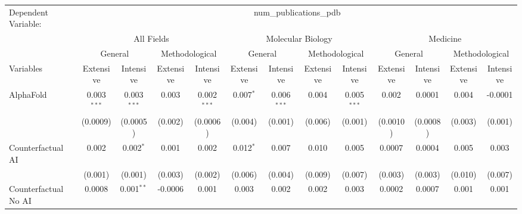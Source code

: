 \begingroup
\centering
\begin{tabular}{lcccccccccccc}
   \tabularnewline \midrule \midrule
   Dependent Variable: & \multicolumn{12}{c}{num\_publications\_pdb}\\
 & \multicolumn{4}{c}{All Fields} & \multicolumn{4}{c}{Molecular Biology} & \multicolumn{4}{c}{Medicine} \\
\cmidrule(lr){2-5} \cmidrule(lr){6-9} \cmidrule(lr){10-13}
 & \multicolumn{2}{c}{General} & \multicolumn{2}{c}{Methodological} & \multicolumn{2}{c}{General} & \multicolumn{2}{c}{Methodological} & \multicolumn{2}{c}{General} & \multicolumn{2}{c}{Methodological} \\
\cmidrule(lr){2-3} \cmidrule(lr){4-5} \cmidrule(lr){6-7} \cmidrule(lr){8-9} \cmidrule(lr){10-11} \cmidrule(lr){12-13}
Variables & \multicolumn{1}{c}{Extensive} & \multicolumn{1}{c}{Intensive} & \multicolumn{1}{c}{Extensive} & \multicolumn{1}{c}{Intensive} & \multicolumn{1}{c}{Extensive} & \multicolumn{1}{c}{Intensive} & \multicolumn{1}{c}{Extensive} & \multicolumn{1}{c}{Intensive} & \multicolumn{1}{c}{Extensive} & \multicolumn{1}{c}{Intensive} & \multicolumn{1}{c}{Extensive} & \multicolumn{1}{c}{Intensive} \\
\cmidrule(lr){1-1}\cmidrule(lr){2-2} \cmidrule(lr){3-3} \cmidrule(lr){4-4} \cmidrule(lr){5-5} \cmidrule(lr){6-6} \cmidrule(lr){7-7} \cmidrule(lr){8-8} \cmidrule(lr){9-9} \cmidrule(lr){10-10} \cmidrule(lr){11-11} \cmidrule(lr){12-12} \cmidrule(lr){13-13}
   AlphaFold                                & 0.003$^{***}$ & 0.003$^{***}$ & 0.003   & 0.002$^{***}$ & 0.007$^{*}$ & 0.006$^{***}$ & 0.004   & 0.005$^{***}$ & 0.002    & 0.0001   & 0.004   & -0.0001\\   
                                            & (0.0009)      & (0.0005)      & (0.002) & (0.0006)      & (0.004)     & (0.001)       & (0.006) & (0.001)       & (0.0010) & (0.0008) & (0.003) & (0.001)\\   
   Counterfactual AI                        & 0.002         & 0.002$^{*}$   & 0.001   & 0.002         & 0.012$^{*}$ & 0.007         & 0.010   & 0.005         & 0.0007   & 0.0004   & 0.005   & 0.003\\   
                                            & (0.001)       & (0.001)       & (0.003) & (0.002)       & (0.006)     & (0.004)       & (0.009) & (0.007)       & (0.003)  & (0.003)  & (0.010) & (0.007)\\   
   Counterfactual No AI                     & 0.0008        & 0.001$^{**}$  & -0.0006 & 0.001         & 0.003       & 0.002         & 0.002   & 0.003         & 0.0002   & 0.0007   & 0.001   & 0.001\\   

\end{tabular}
